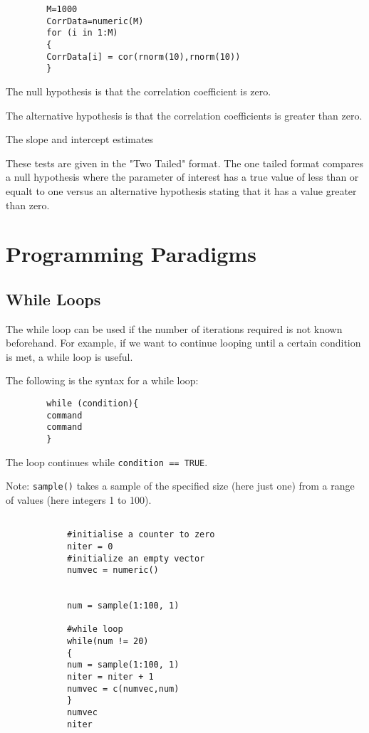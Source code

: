 \documentclass[a4paper,12pt]{article}
\begin{document}
\begin{itemize}
\begin{itemize}
		\begin{verbatim}
		M=1000
		CorrData=numeric(M)
		for (i in 1:M)
		{
		CorrData[i] = cor(rnorm(10),rnorm(10))
		}
		\end{verbatim}
		The null hypothesis is that the correlation coefficient is zero. 
		
		The alternative hypothesis is that the correlation coefficients is greater than zero. 
		
		The slope and intercept estimates 
		
		These tests are given in the "Two Tailed" format. 
		The one tailed format compares a null hypothesis where the parameter of interest has a true value of less than or equalt to one versus an alternative hypothesis stating that it has a value greater than zero. 
		
		
		
		\newpage
		\section{Programming Paradigms}
		\subsection{While Loops}
		The while loop can be used if the number of iterations required is not known beforehand. For example, if we want to continue looping until a certain condition is met, a while loop is useful.
		
		The following is the syntax for a while loop:
		
		\begin{verbatim}
		while (condition){
		command
		command
		}
		\end{verbatim}
		The loop continues while \texttt{condition == TRUE}.
		
		
		Note: \texttt{sample()} takes a sample of the specified size (here just one) from a range of values (here integers 1 to 100).
		\begin{framed}
			\begin{verbatim}
			
			#initialise a counter to zero
			niter = 0		
			#initialize an empty vector
			numvec = numeric()
			
			
			num = sample(1:100, 1)
			
			#while loop
			while(num != 20)
			{
			num = sample(1:100, 1)
			niter = niter + 1
			numvec = c(numvec,num)
			}
			numvec
			niter
			

\end{verbatim}
\end{framed}
\end{itemize}
\end{itemize}
\end{document}
